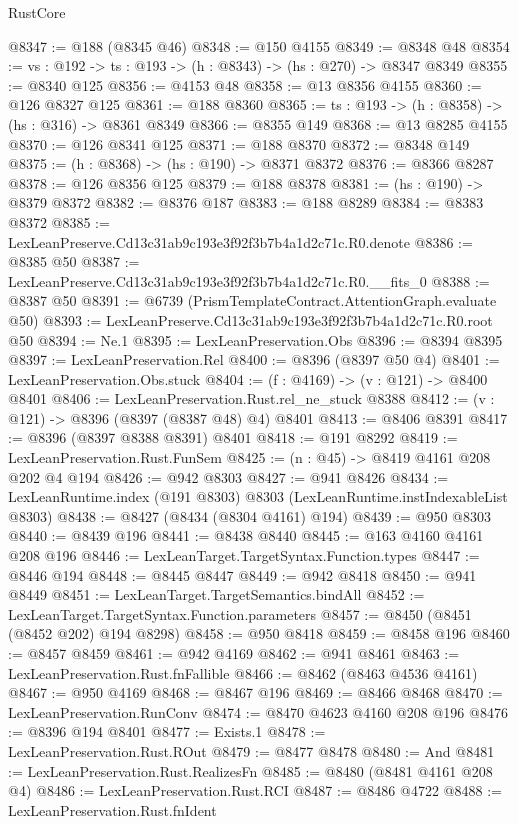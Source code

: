 \begin{lexlean}{RustCore}
\begin{coremodule}
@8347 := @188 (@8345 @46)
@8348 := @150 @4155
@8349 := @8348 @48
@8354 := {vs : @192} -> {ts : @193} -> (h : @8343) -> (hs : @270) -> @8347 @8349
@8355 := @8340 @125
@8356 := @4153 @48
@8358 := @13 @8356 @4155
@8360 := @126 @8327 @125
@8361 := @188 @8360
@8365 := {ts : @193} -> (h : @8358) -> (hs : @316) -> @8361 @8349
@8366 := @8355 @149
@8368 := @13 @8285 @4155
@8370 := @126 @8341 @125
@8371 := @188 @8370
@8372 := @8348 @149
@8375 := (h : @8368) -> (hs : @190) -> @8371 @8372
@8376 := @8366 @8287
@8378 := @126 @8356 @125
@8379 := @188 @8378
@8381 := (hs : @190) -> @8379 @8372
@8382 := @8376 @187
@8383 := @188 @8289
@8384 := @8383 @8372
@8385 := LexLeanPreserve.Cd13c31ab9c193e3f92f3b7b4a1d2c71c.R0.denote
@8386 := @8385 @50
@8387 := LexLeanPreserve.Cd13c31ab9c193e3f92f3b7b4a1d2c71c.R0.__fits_0
@8388 := @8387 @50
@8391 := @6739 (PrismTemplateContract.AttentionGraph.evaluate @50)
@8393 := LexLeanPreserve.Cd13c31ab9c193e3f92f3b7b4a1d2c71c.R0.root @50
@8394 := Ne.{1}
@8395 := LexLeanPreservation.Obs
@8396 := @8394 @8395
@8397 := LexLeanPreservation.Rel
@8400 := @8396 (@8397 @50 @4)
@8401 := LexLeanPreservation.Obs.stuck
@8404 := (f : @4169) -> (v : @121) -> @8400 @8401
@8406 := LexLeanPreservation.Rust.rel_ne_stuck @8388
@8412 := (v : @121) -> @8396 (@8397 (@8387 @48) @4) @8401
@8413 := @8406 @8391
@8417 := @8396 (@8397 @8388 @8391) @8401
@8418 := @191 @8292
@8419 := LexLeanPreservation.Rust.FunSem
@8425 := (n : @45) -> @8419 @4161 @208 @202 @4 @194
@8426 := @942 @8303
@8427 := @941 @8426
@8434 := LexLeanRuntime.index (@191 @8303) @8303 (LexLeanRuntime.instIndexableList @8303)
@8438 := @8427 (@8434 (@8304 @4161) @194)
@8439 := @950 @8303
@8440 := @8439 @196
@8441 := @8438 @8440
@8445 := @163 @4160 @4161 @208 @196
@8446 := LexLeanTarget.TargetSyntax.Function.types
@8447 := @8446 @194
@8448 := @8445 @8447
@8449 := @942 @8418
@8450 := @941 @8449
@8451 := LexLeanTarget.TargetSemantics.bindAll
@8452 := LexLeanTarget.TargetSyntax.Function.parameters
@8457 := @8450 (@8451 (@8452 @202) @194 @8298)
@8458 := @950 @8418
@8459 := @8458 @196
@8460 := @8457 @8459
@8461 := @942 @4169
@8462 := @941 @8461
@8463 := LexLeanPreservation.Rust.fnFallible
@8466 := @8462 (@8463 @4536 @4161)
@8467 := @950 @4169
@8468 := @8467 @196
@8469 := @8466 @8468
@8470 := LexLeanPreservation.RunConv
@8474 := @8470 @4623 @4160 @208 @196
@8476 := @8396 @194 @8401
@8477 := Exists.{1}
@8478 := LexLeanPreservation.Rust.ROut
@8479 := @8477 @8478
@8480 := And
@8481 := LexLeanPreservation.Rust.RealizesFn
@8485 := @8480 (@8481 @4161 @208 @4)
@8486 := LexLeanPreservation.Rust.RCI
@8487 := @8486 @4722
@8488 := LexLeanPreservation.Rust.fnIdent

\end{coremodule}
\end{lexlean}
